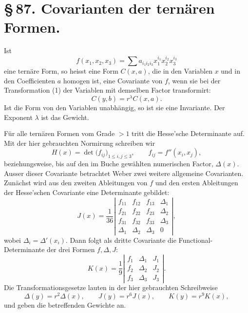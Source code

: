 \documentclass[11pt]{article}
\begin{document}
\section*{\S\,87. Covarianten der ternären Formen.}

Ist
\[
 f(x_1,x_2,x_3)=\sum a_{i_1i_2i_3}x_1^{i_1}x_2^{i_2}x_3^{i_3}
\]
eine ternäre Form, so heisst eine Form $C(x,a)$, die in den Variablen $x$ und in den Coefficienten $a$ homogen ist, eine Covariante von $f$, wenn sie bei der Transformation (1) der Variablen mit demselben Factor transformirt:
\begin{equation}
 C(y,b)=r^\lambda C(x,a).
 \tag{1}
\end{equation}
Ist die Form von den Variablen unabhängig, so ist sie eine Invariante. Der Exponent $\lambda$ ist das Gewicht.

Für alle ternären Formen vom Grade $>1$ tritt die Hesse'sche Determinante auf. Mit der hier gebrauchten Normirung schreiben wir
\begin{equation}
 H(x)=\det\bigl(f_{ij}\bigr)_{1\le i,j\le3},\qquad f_{ij}=f''(x_i,x_j),
 \tag{2}
\end{equation}
beziehungsweise, bis auf den im Buche gewählten numerischen Factor, $\Delta(x)$. Ausser dieser Covariante betrachtet Weber zwei weitere allgemeine Covarianten. Zunächst wird aus den zweiten Ableitungen von $f$ und den ersten Ableitungen der Hesse'schen Covariante eine Determinante gebildet:
\begin{equation}
 J(x)=\frac1{36}
 \left|\begin{array}{cccc}
 f_{11}&f_{12}&f_{13}&\Delta_1\\
 f_{21}&f_{22}&f_{23}&\Delta_2\\
 f_{31}&f_{32}&f_{33}&\Delta_3\\
 \Delta_1&\Delta_2&\Delta_3&0
 \end{array}\right|,
 \tag{3}
\end{equation}
wobei $\Delta_i=\Delta'(x_i)$. Dann folgt als dritte Covariante die Functional-Determinante der drei Formen $f,\Delta,J$:
\begin{equation}
 K(x)=\frac1{9}
 \left|\begin{array}{ccc}
 f_1&\Delta_1&J_1\\
 f_2&\Delta_2&J_2\\
 f_3&\Delta_3&J_3
 \end{array}\right|.
 \tag{4}
\end{equation}
Die Transformationsgesetze lauten in der hier gebrauchten Schreibweise
\begin{equation}
 \Delta(y)=r^2\Delta(x),\qquad J(y)=r^6J(x),\qquad K(y)=r^9K(x),
 \tag{5}
\end{equation}
und geben die betreffenden Gewichte an.
\end{document}
